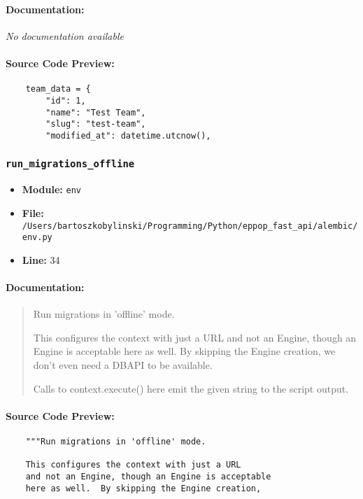\documentclass[11pt,a4paper]{article}
\begin{document}
\paragraph{Documentation:} \textit{No documentation available}

\paragraph{Source Code Preview:}
\begin{verbatim}
    team_data = {
        "id": 1,
        "name": "Test Team",
        "slug": "test-team",
        "modified_at": datetime.utcnow(),
\end{verbatim}

\vspace{1em}
\subsubsection{\texttt{run\_migrations\_offline}}

\begin{itemize}
    \item \textbf{Module:} \texttt{env}
    \item \textbf{File:} \texttt{/Users/bartoszkobylinski/Programming/Python/eppop\_fast\_api/alembic/env.py}
    \item \textbf{Line:} 34
\end{itemize}

\paragraph{Documentation:}
\begin{quote}
Run migrations in 'offline' mode.

This configures the context with just a URL
and not an Engine, though an Engine is acceptable
here as well.  By skipping the Engine creation,
we don't even need a DBAPI to be available.

Calls to context.execute() here emit the given string to the
script output.
\end{quote}

\paragraph{Source Code Preview:}
\begin{verbatim}
    """Run migrations in 'offline' mode.

    This configures the context with just a URL
    and not an Engine, though an Engine is acceptable
    here as well.  By skipping the Engine creation,
\end{verbatim}
\end{document}
